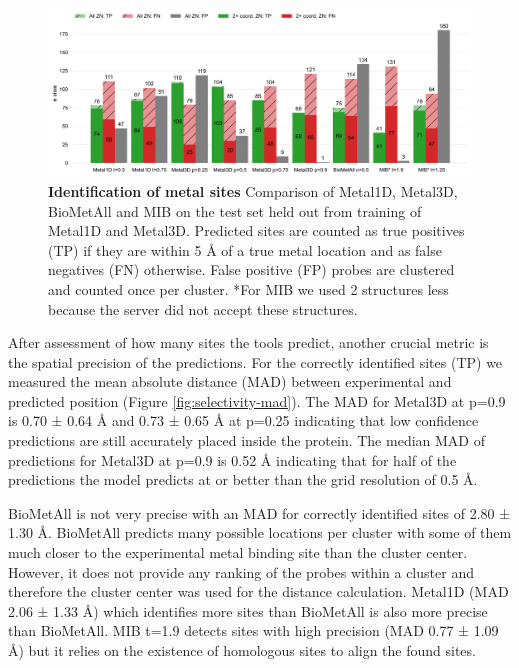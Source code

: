 \documentclass[  ASAPversion,
  ,
  9pt]{elife}
\begin{document}
\begin{figure}
\hypertarget{fig:comparison}{%
\centering
\includegraphics{images/all_2coord_metal_1d_3d_min_biometall_comparison.jpg}
\caption{\textbf{Identification of metal sites} Comparison of Metal1D, Metal3D, BioMetAll and MIB on the test set held out from training of Metal1D and Metal3D. Predicted sites are counted as true positives (TP) if they are within 5 Å of a true metal location and as false negatives (FN) otherwise. False positive (FP) probes are clustered and counted once per cluster. *For MIB we used 2 structures less because the server did not accept these structures.}\label{fig:comparison}
}
\end{figure}

After assessment of how many sites the tools predict, another crucial metric is the spatial precision of the predictions. For the correctly identified sites (TP) we measured the mean absolute distance (MAD) between experimental and predicted position (Figure \ref{fig:selectivity-mad}). The MAD for Metal3D at p=0.9 is 0.70 ± 0.64 Å and 0.73 ± 0.65 Å at p=0.25 indicating that low confidence predictions are still accurately placed inside the protein. The median MAD of predictions for Metal3D at p=0.9 is 0.52 Å indicating that for half of the predictions the model predicts at or better than the grid resolution of 0.5 Å.

BioMetAll is not very precise with an MAD for correctly identified sites of 2.80 ± 1.30 Å. BioMetAll predicts many possible locations per cluster with some of them much closer to the experimental metal binding site than the cluster center. However, it does not provide any ranking of the probes within a cluster and therefore the cluster center was used for the distance calculation. Metal1D (MAD 2.06 ± 1.33 Å) which identifies more sites than BioMetAll is also more precise than BioMetAll. MIB t=1.9 detects sites with high precision (MAD 0.77 ± 1.09 Å) but it relies on the existence of homologous sites to align the found sites.
\end{document}
